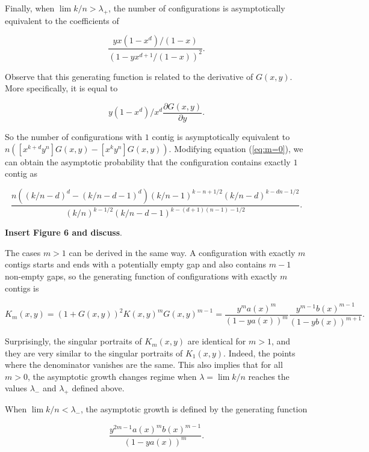 \documentclass{article}
\begin{document}
Finally, when $\lim k/n > \lambda_+$, the number of configurations is
asymptotically equivalent to the coefficients of

\begin{equation*}
\frac{yx(1-x^d)/(1-x)}{\left( 1-yx^{d+1}/(1-x) \right)^2}.
\end{equation*}

Observe that this generating function is related to the derivative of
$G(x,y)$. More specifically, it is equal to

\begin{equation*}
y(1-x^d)/x^d\frac{\partial G(x,y)}{\partial y}.
\end{equation*}

So the number of configurations with $1$ contig is asymptotically
equivalent to $n \left( [x^{k+d}y^n]G(x,y)-[x^ky^n]G(x,y) \right)$.
Modifying equation (\ref{eq:m=0}), we can obtain the asymptotic
probability that the configuration contains exactly $1$ contig as

\begin{equation*}
\frac{n((k/n-d)^d-(k/n-d-1)^d)(k/n-1)^{k-n+1/2}(k/n-d)^{k-dn-1/2}}
 {(k/n)^{k-1/2}(k/n-d-1)^{k-(d+1)(n-1)-1/2}}.
\end{equation*}

\textbf{Insert Figure 6 and discuss}.

The cases $m > 1$ can be derived in the same way. A configuration with
exactly $m$ contigs starts and ends with a potentially empty gap and
also contains $m-1$ non-empty gaps, so the generating function of
configurations with exactly $m$ contigs is

\begin{equation*}
K_m(x,y) = (1+G(x,y))^2K(x,y)^mG(x,y)^{m-1} =
\frac{y^ma(x)^m}{\left(1-ya(x)\right)^m}
\frac{y^{m-1}b(x)^{m-1}}{\left(1-yb(x)\right)^{m+1}}.
\end{equation*}

Surprisingly, the singular portraits of $K_m(x,y)$ are identical for $m >
1$, and they are very similar to the singular portraits of $K_1(x,y)$.
Indeed, the points where the denominator vanishes are the same. This also
implies that for all $m > 0$, the asymptotic growth changes regime when
$\lambda = \lim k/n$ reaches the values $\lambda_-$ and $\lambda_+$
defined above.

When $\lim k/n < \lambda_-$, the asymptotic growth is defined by the
generating function

\begin{equation*}
\frac{y^{2m-1}a(x)^mb(x)^{m-1}}{\left(1-ya(x)\right)^m}.
\end{equation*}
\end{document}
